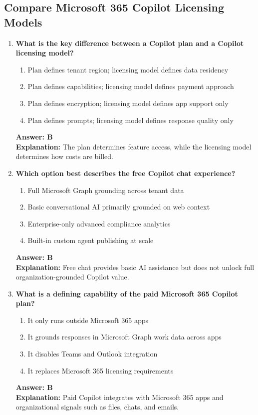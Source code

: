 \documentclass[10pt]{article}
\begin{document}
\clearpage
\subsection{Compare Microsoft 365 Copilot Licensing Models}
\begin{enumerate}[leftmargin=*]

\item \textbf{What is the key difference between a Copilot plan and a Copilot licensing model?}
\begin{enumerate}[label=\Alph*.]
  \item Plan defines tenant region; licensing model defines data residency
  \item Plan defines capabilities; licensing model defines payment approach
  \item Plan defines encryption; licensing model defines app support only
  \item Plan defines prompts; licensing model defines response quality only
\end{enumerate}
\textbf{Answer: B}\\
\textbf{Explanation:} The plan determines feature access, while the licensing model determines how costs are billed.

\item \textbf{Which option best describes the free Copilot chat experience?}
\begin{enumerate}[label=\Alph*.]
  \item Full Microsoft Graph grounding across tenant data
  \item Basic conversational AI primarily grounded on web context
  \item Enterprise-only advanced compliance analytics
  \item Built-in custom agent publishing at scale
\end{enumerate}
\textbf{Answer: B}\\
\textbf{Explanation:} Free chat provides basic AI assistance but does not unlock full organization-grounded Copilot value.

\item \textbf{What is a defining capability of the paid Microsoft 365 Copilot plan?}
\begin{enumerate}[label=\Alph*.]
  \item It only runs outside Microsoft 365 apps
  \item It grounds responses in Microsoft Graph work data across apps
  \item It disables Teams and Outlook integration
  \item It replaces Microsoft 365 licensing requirements
\end{enumerate}
\textbf{Answer: B}\\
\textbf{Explanation:} Paid Copilot integrates with Microsoft 365 apps and organizational signals such as files, chats, and emails.


\end{enumerate}
\end{document}
